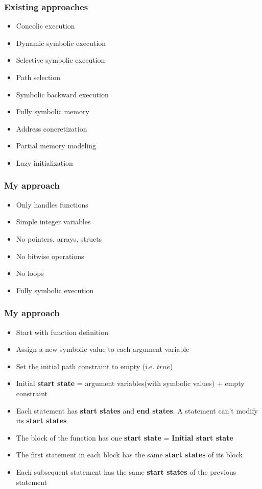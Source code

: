 \documentclass{beamer}
\begin{document}
\begin{frame}[fragile]
\frametitle{Existing approaches}
\begin{itemize}
\item Concolic execution
\item Dynamic symbolic execution
\item Selective symbolic execution
\item Path selection
\item Symbolic backward execution
\item Fully symbolic memory
\item Address concretization
\item Partial memory modeling
\item Lazy initialization

\end{itemize}
\end{frame}

\begin{frame}[fragile]
\frametitle{My approach}
\begin{itemize}
\item Only handles functions
\item Simple integer variables
\item No pointers, arrays, structs 
\item No bitwise operations
\item No loops
\item Fully symbolic execution
\end{itemize}
\end{frame}

\begin{frame}[fragile]
\frametitle{My approach}
\begin{itemize}
\item Start with function definition
\item Assign a new symbolic value to each argument variable
\item Set the initial path constraint to empty (i.e. $true$)
\item Initial \textbf{start state} = argument variables(with symbolic values) + empty constraint
\item Each statement has \textbf{start states} and \textbf{end states}. A statement can't modify its \textbf{start states}

\item The block of the function has one \textbf{start state} = \textbf{Initial start state}

\item The first statement in each block has the same \textbf{start states} of its block

\item Each subsequent statement has the same \textbf{start states} of the previous statement
\end{itemize}
\end{frame}
\end{document}
